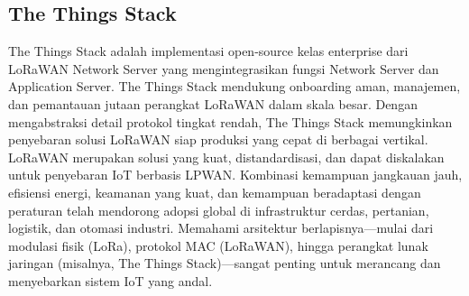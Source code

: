 \subsection{The Things Stack}
The Things Stack adalah implementasi open-source kelas enterprise dari LoRaWAN Network Server yang mengintegrasikan fungsi Network Server dan Application Server. The Things Stack mendukung onboarding aman, manajemen, dan pemantauan jutaan perangkat LoRaWAN dalam skala besar. Dengan mengabstraksi detail protokol tingkat rendah, The Things Stack memungkinkan penyebaran solusi LoRaWAN siap produksi yang cepat di berbagai vertikal.
LoRaWAN merupakan solusi yang kuat, distandardisasi, dan dapat diskalakan untuk penyebaran IoT berbasis LPWAN. Kombinasi kemampuan jangkauan jauh, efisiensi energi, keamanan yang kuat, dan kemampuan beradaptasi dengan peraturan telah mendorong adopsi global di infrastruktur cerdas, pertanian, logistik, dan otomasi industri. Memahami arsitektur berlapisnya—mulai dari modulasi fisik (LoRa), protokol MAC (LoRaWAN), hingga perangkat lunak jaringan (misalnya, The Things Stack)—sangat penting untuk merancang dan menyebarkan sistem IoT yang andal.
